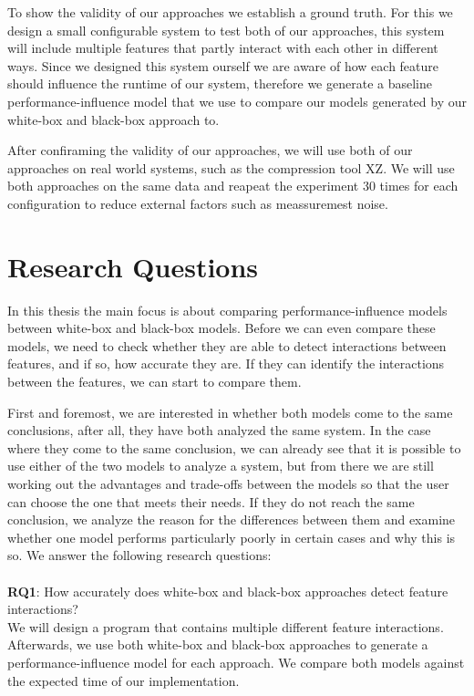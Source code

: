 To show the validity of our approaches we establish a ground truth. For this we design a small configurable system to test both of our 
approaches, this system will include multiple features that partly interact with each other in different ways. Since we designed this system
ourself we are aware of how each feature should influence the runtime of our system, therefore we generate a baseline performance-influence 
model that we use to compare our models generated by our white-box and black-box approach to.

After confiraming the validity of our approaches, we will use both of our approaches on real world systems, such as the compression tool
XZ. We will use both approaches on the same data and reapeat the experiment 30 times for each configuration to reduce external factors such
as meassuremest noise.

\section{Research Questions}
In this thesis the main focus is about comparing performance-influence models between white-box and black-box models. 
Before we can even compare these models, we need to check whether they are able to detect interactions between features, 
and if so, how accurate they are. If they can identify the interactions between the features, we can start to compare them. 

First and foremost, we are interested in whether both models come to the same conclusions, after all, 
they have both analyzed the same system. In the case where they come to the same conclusion, 
we can already see that it is possible to use either of the two models to analyze a system, 
but from there we are still working out the advantages and trade-offs between the models so that the user can choose the one that meets 
their needs. If they do not reach the same conclusion, we analyze the reason for the differences between them and examine whether one model 
performs particularly poorly in certain cases and why this is so. We answer the following research questions:\\\\

\noindent \textbf{RQ1}: How accurately does white-box and black-box approaches detect feature interactions? \\

\noindent We will design a program that contains multiple different feature interactions. Afterwards, we use both white-box and black-box approaches to generate a
 performance-influence model for each approach.  We compare both models against the expected time of our implementation. \\

